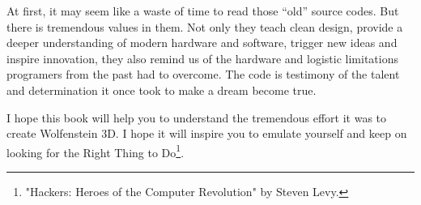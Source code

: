 \documentclass[book.tex]{subfiles}
\begin{document}
\bigskip

At first, it may seem like a waste of time to read those ``old'' source codes. But there is tremendous values in them. Not only they teach clean design, provide a deeper understanding of modern hardware and software, trigger new ideas and inspire innovation, they also remind us of the hardware and logistic limitations programers from the past had to overcome. The code is testimony of the talent and determination it once took to make a dream become true.
\bigskip

I hope this book will help you to understand the tremendous effort it was to create Wolfenstein 3D. I hope it will inspire you to emulate yourself and keep on looking for the Right Thing to Do\footnote{"Hackers: Heroes of the Computer Revolution" by Steven Levy.}.
\end{document}
